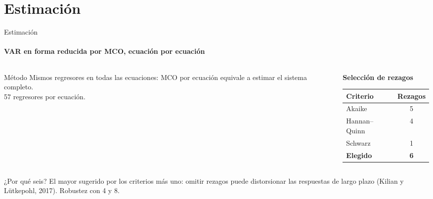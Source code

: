 \documentclass{beamer}
\begin{document}
\section{Estimación}

\begin{frame}{Estimación}
  \framesubtitle{VAR en forma reducida por MCO, ecuación por ecuación}
  \begin{columns}[T]
    \begin{column}{0.48\textwidth}
      \begin{block}{Método}
        \small
        Mismos regresores en todas las ecuaciones: MCO por ecuación equivale a
        estimar el sistema completo.\\[0.2em]
        57 regresores por ecuación.
      \end{block}
    \end{column}
    \begin{column}{0.48\textwidth}
      \scriptsize
      \begin{center}
      \textbf{Selección de rezagos}\\[0.25em]
      \begin{tabular}{lc}
        \toprule
        Criterio & Rezagos \\
        \midrule
        Akaike & 5 \\
        Hannan--Quinn & 4 \\
        Schwarz & 1 \\
        \midrule
        \textbf{Elegido} & \alert{\textbf{6}} \\
        \bottomrule
      \end{tabular}
      \end{center}
    \end{column}
  \end{columns}
  \vfill
  \begin{block}{¿Por qué seis?}
    El mayor sugerido por los criterios más uno: omitir rezagos puede distorsionar las
    respuestas de largo plazo (Kilian y Lütkepohl, 2017). Robustez con 4 y 8.
  \end{block}
\end{frame}
\end{document}
